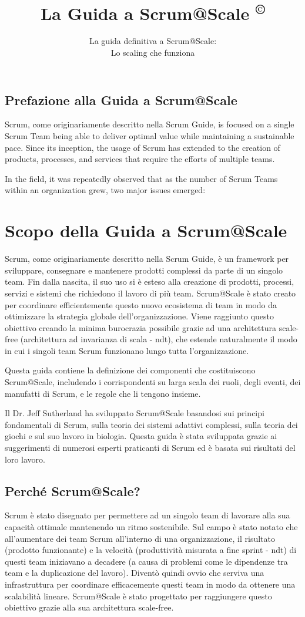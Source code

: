 \documentclass[italian,12pt,a4paper,parskip=full]{scrartcl}
\title{\Huge{\color{red}\textbf{La Guida a Scrum@Scale
\textsuperscript{\copyright}
}}}
\subtitle{\color{gray}La guida definitiva a Scrum@Scale:\\ Lo scaling che funziona}
\date{}
\begin{document}
 \subsection{Prefazione alla Guida a Scrum@Scale}\label{preface-to-the-ScrumatScale-guide}

 Scrum, come originariamente descritto nella Scrum Guide, is focused on a single Scrum Team being able to deliver optimal value while maintaining a sustainable pace. Since its inception, the usage of Scrum has extended to the creation of products, processes, and services that require the efforts of multiple teams.

 In the field, it was repeatedly observed that as the number of Scrum Teams within an organization grew, two major issues emerged:


\section{Scopo della Guida a Scrum@Scale}
Scrum, come originariamente descritto nella Scrum Guide, è un 
framework per sviluppare, consegnare e mantenere prodotti complessi da parte di
 un singolo team. Fin dalla nascita, il suo uso si è esteso alla creazione di
prodotti, processi, servizi e sistemi che richiedono il lavoro di più team.
Scrum@Scale è stato creato per coordinare efficientemente questo nuovo 
ecosistema di team in modo da ottimizzare la strategia 
globale dell'organizzazione. Viene raggiunto questo obiettivo creando la 
minima burocrazia possibile grazie ad una architettura scale-free (architettura ad invarianza di scala - ndt), che estende naturalmente il modo in cui i singoli team Scrum funzionano lungo tutta l'organizzazione.

Questa guida contiene la definizione dei componenti che costituiscono Scrum@Scale, includendo i corrispondenti su larga scala dei ruoli, degli eventi, dei manufatti di Scrum, e le regole che li tengono insieme.

Il Dr. Jeff Sutherland ha sviluppato Scrum@Scale basandosi sui principi fondamentali di Scrum, sulla teoria dei sistemi adattivi complessi, sulla teoria dei giochi e sul suo lavoro in biologia. Questa guida è stata sviluppata grazie ai suggerimenti di numerosi esperti praticanti di Scrum ed è basata sui risultati del loro lavoro. 

\subsection{Perché Scrum@Scale?}
Scrum è stato disegnato per permettere ad un singolo team di lavorare 
alla sua capacità ottimale mantenendo un ritmo sostenibile. Sul campo è
stato notato che all'aumentare dei team Scrum all'interno di una organizzazione,
il risultato (prodotto funzionante) e la velocità (produttività misurata a fine sprint - ndt) di questi team iniziavano a decadere (a causa di problemi come le dipendenze tra team e la duplicazione del lavoro). Diventò quindi ovvio che serviva una infrastruttura per coordinare 
efficacemente questi team in modo da ottenere una scalabilità lineare.
Scrum@Scale è stato progettato per raggiungere questo obiettivo grazie alla
sua architettura scale-free.
\end{document}
